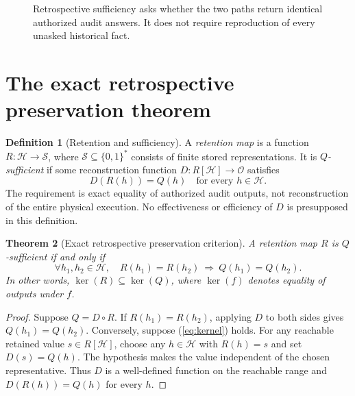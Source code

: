 \documentclass[11pt,letterpaper]{article}
\newtheorem{theorem}{Theorem}[section]
\theoremstyle{definition}
\newtheorem{definition}[theorem]{Definition}
\newcommand{\Hh}{\mathcal H}
\newcommand{\Obs}{\mathcal O}
\newcommand{\State}{\mathcal S}
\begin{document}
\begin{figure}[htbp]\centering
{}
\caption{Retrospective sufficiency asks whether the two paths return identical authorized audit answers. It does not require reproduction of every unasked historical fact.}
\label{fig:factor}
\end{figure}

\section{The exact retrospective preservation theorem}
\begin{definition}[Retention and sufficiency]
A \emph{retention map} is a function $R:\Hh\to\State$, where $\State\subseteq\{0,1\}^*$ consists of finite stored representations. It is \emph{$Q$-sufficient} if some reconstruction function $D:R[\Hh]\to\Obs$ satisfies
\[
D(R(h))=Q(h)\quad\text{for every }h\in\Hh.
\]
The requirement is exact equality of authorized audit outputs, not reconstruction of the entire physical execution. No effectiveness or efficiency of $D$ is presupposed in this definition.
\end{definition}

\begin{theorem}[Exact retrospective preservation criterion]\label{thm:static}
A retention map $R$ is $Q$-sufficient if and only if
\begin{equation}\label{eq:kernel}
\forall h_1,h_2\in\Hh,\quad R(h_1)=R(h_2)\ \Longrightarrow\ Q(h_1)=Q(h_2).
\end{equation}
In other words, $\ker(R)\subseteq\ker(Q)$, where $\ker(f)$ denotes equality of outputs under $f$.
\end{theorem}
\begin{proof}
Suppose $Q=D\circ R$. If $R(h_1)=R(h_2)$, applying $D$ to both sides gives $Q(h_1)=Q(h_2)$. Conversely, suppose (\ref{eq:kernel}) holds. For any reachable retained value $s\in R[\Hh]$, choose any $h\in\Hh$ with $R(h)=s$ and set $D(s)=Q(h)$. The hypothesis makes the value independent of the chosen representative. Thus $D$ is a well-defined function on the reachable range and $D(R(h))=Q(h)$ for every $h$.
\end{proof}
\end{document}
